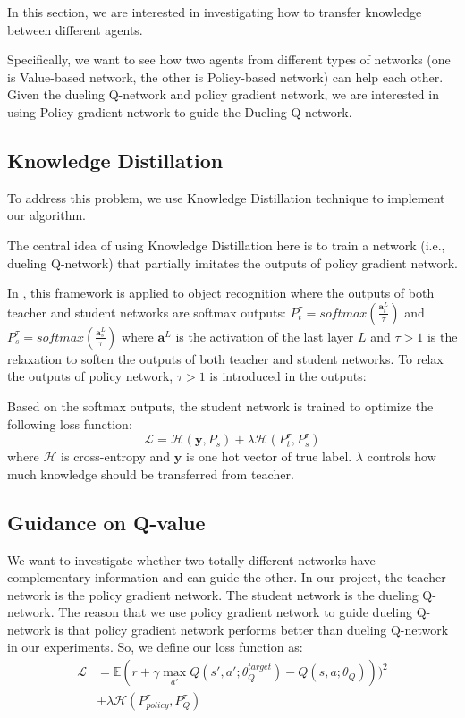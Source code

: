 In this section, we are interested in investigating how to transfer knowledge between different agents.

Specifically, we want to see how two agents from different types of networks (one is Value-based network, the other is Policy-based network) can help each other.
% 
Given the dueling Q-network and policy gradient network, we are interested in using Policy gradient network to guide the Dueling Q-network.

\subsection{Knowledge Distillation}


To address this problem, we use Knowledge Distillation \cite{hinton2015distilling} technique to implement our algorithm.

The central idea of using Knowledge Distillation here is to train a network (i.e., dueling Q-network) that partially imitates the outputs of policy gradient network.

In \cite{hinton2015distilling}, this framework is applied to object recognition where the outputs of both teacher and student networks are softmax outputs:
$
P^{\tau}_{t} = softmax(\frac{\textbf{a}^{L}_{t}}{\tau} )
$
and
$
P^{\tau}_{s} = softmax(\frac{\textbf{a}^{L}_{s}}{\tau} )
$
%
where $\textbf{a}^{L}$ is the activation of the last layer $L$ and $\tau > 1$ is the relaxation to soften the outputs of both teacher and student networks. 
%
To relax the outputs of policy network, $\tau >1$ is introduced in the outputs:

Based on the softmax outputs, the student network is trained to optimize the following loss function:
\begin{equation}
\mathcal{L} = \mathcal{H} ( \textbf{y},P_{s} ) + \lambda\mathcal{H} ( P^{\tau}_{t},P^{\tau}_{s} ) 
\end{equation}
where $\mathcal{H}$ is cross-entropy and $\textbf{y}$ is one hot vector of true label. $\lambda$ controls how much knowledge should be transferred from teacher. 
 
\subsection{Guidance on Q-value}

%
We want to investigate whether two totally different networks have complementary information and can guide the other.
%
In our project, the teacher network is the policy gradient network. The student network is the dueling Q-network. The reason that we use policy gradient network to guide dueling Q-network is that policy gradient network performs better than dueling Q-network in our experiments.
%
So, we define our loss function as:
\begin{equation}
\begin{split}
\mathcal{L} &= \mathbb{E}(r+\gamma \max_{a'}Q(s',a';\theta^{target}_{Q})-Q(s,a;\theta_{Q})))^2  \\
& + \lambda\mathcal{H} ( P^{\tau}_{policy},P^{\tau}_{Q} )
\end{split}
\label{equ.kd1}
\end{equation}

